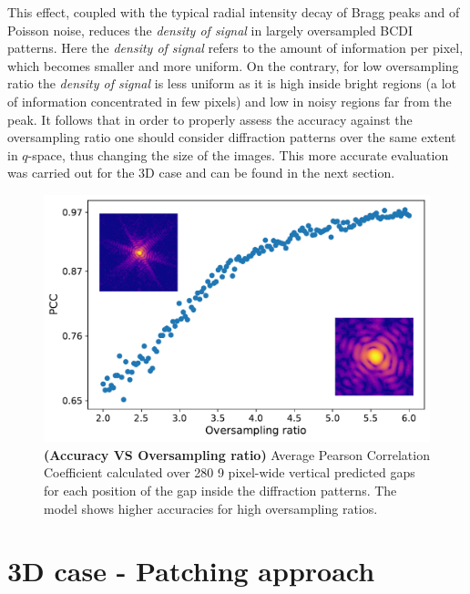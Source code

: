 This effect, coupled with the typical radial
intensity decay of Bragg peaks and of Poisson noise, reduces the \textit{density of signal} in largely oversampled BCDI 
patterns. Here the \textit{density of signal} refers to the amount of information per pixel, which becomes smaller and more uniform. 
On the contrary, for low oversampling ratio the \textit{density of signal} is less uniform as it is high inside bright 
regions (a lot of information concentrated in few pixels) and low in noisy regions far from the peak. It follows that 
in order to properly assess the accuracy against the oversampling ratio one should consider diffraction patterns over 
the same extent in $q$-space, thus changing the size of the images. This more accurate evaluation was carried out for 
the 3D case and can be found in the next section.

\begin{figure}[h]
    \centering
    \includegraphics[width=.7\textwidth]{figures/Inpainting/2D_acc_ovs.pdf}
    \caption{\textbf{(Accuracy VS Oversampling ratio)} Average Pearson Correlation Coefficient calculated over 280
    9 pixel-wide vertical predicted gaps for each position of the gap inside the diffraction patterns. The model 
    shows higher accuracies for high oversampling ratios.}
    \label{fig:accVSovs}
\end{figure}

\section{3D case - Patching approach}\label{sec:patching}

